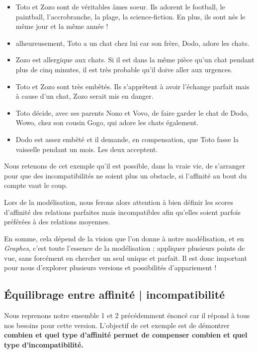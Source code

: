 \documentclass{mytex}
\begin{document}
\begin{itemize}
    \item Toto et Zozo sont de véritables âmes soeur. Ils adorent le football, le paintball, l'accrobranche, la plage, la science-fiction. En plus, ils sont nés le même jour et la même année !
    \item alheureusement, Toto a un chat chez lui car son frère, Dodo, adore les chats.
    \item Zozo est allergique aux chats. Si il est dans la même pièce qu'un chat pendant plus de cinq minutes, il est très probable qu'il doive aller aux urgences.
    \item Toto et Zozo sont très embêtés. Ils s'apprêtent à avoir l'échange parfait mais à cause d'un chat, Zozo serait mis en danger.
    \item Toto décide, avec ses parents Nono et Vovo, de faire garder le chat de Dodo, Wowo, chez son cousin Gogo, qui adore les chats également.
    \item Dodo est assez embêté et il demande, en compensation, que Toto fasse la vaisselle pendant un mois. Les deux acceptent.
\end{itemize}

Nous retenons de cet exemple qu'il est possible, dans la vraie vie, de s'arranger pour que des incompatibilités ne soient plus un obstacle, si l'affinité au bout du compte vaut le coup.


Lors de la modélisation, nous ferons alors attention à bien définir les scores d'affinité des relations parfaites mais incompatibles afin qu'elles soient parfois préférées à des relations moyennes.

En somme, cela dépend de la vision que l'on donne à notre modélisation, et en \textit{Graphes}, c'est toute l'essence de la modélisation ; appliquer plusieurs points de vue, sans forcément en chercher un seul unique et parfait.
Il est donc important pour nous d'explorer plusieurs versions et possibilités d'appariement !

\subsection{Équilibrage entre affinité | incompatibilité}

Nous reprenons notre ensemble 1 et 2 précédemment énoncé car il répond à tous nos besoins pour cette version.
L'objectif de cet exemple est de démontrer \textbf{combien et quel type d'affinité permet de compenser combien et quel type d'incompatibilité.}
\end{document}
